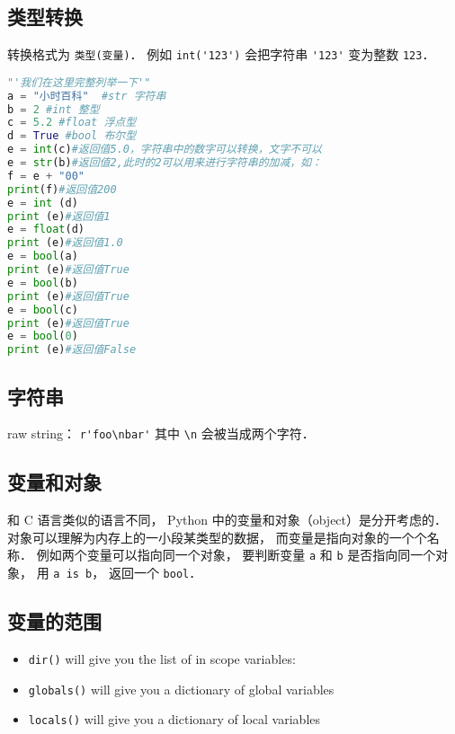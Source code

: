\subsection{类型转换}
转换格式为 \verb|类型(变量)|． 例如 \verb|int('123')| 会把字符串 \verb|'123'| 变为整数 \verb|123|．
\begin{lstlisting}[language=python]
"'我们在这里完整列举一下'"
a = "小时百科"  #str 字符串
b = 2 #int 整型
c = 5.2 #float 浮点型
d = True #bool 布尔型
e = int(c)#返回值5.0，字符串中的数字可以转换，文字不可以
e = str(b)#返回值2,此时的2可以用来进行字符串的加减，如：
f = e + "00"
print(f)#返回值200
e = int (d)
print (e)#返回值1
e = float(d)
print (e)#返回值1.0
e = bool(a)
print (e)#返回值True
e = bool(b)
print (e)#返回值True
e = bool(c)
print (e)#返回值True
e = bool(0)
print (e)#返回值False
\end{lstlisting}
\subsection{字符串}
raw string： \verb|r'foo\nbar'| 其中 \verb|\n| 会被当成两个字符．

\subsection{变量和对象}
和 C 语言类似的语言不同， Python 中的变量和对象（object）是分开考虑的． 对象可以理解为内存上的一小段某类型的数据， 而变量是指向对象的一个个名称． 例如两个变量可以指向同一个对象， 要判断变量 \verb|a| 和 \verb|b| 是否指向同一个对象， 用 \verb|a is b|， 返回一个 \verb|bool|．

\subsection{变量的范围}
\begin{itemize}
\item \verb|dir()| will give you the list of in scope variables:
\item \verb|globals()| will give you a dictionary of global variables
\item \verb|locals()| will give you a dictionary of local variables
\end{itemize}
